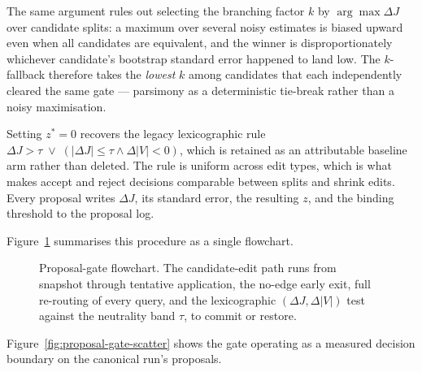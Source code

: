 The same argument rules out selecting the branching factor $k$ by
$\arg\max \Delta J$ over candidate splits: a maximum over several noisy
estimates is biased upward even when all candidates are equivalent, and
the winner is disproportionately whichever candidate's bootstrap
standard error happened to land low. The $k$-fallback therefore takes
the \emph{lowest} $k$ among candidates that each independently cleared
the same gate --- parsimony as a deterministic tie-break rather than a
noisy maximisation.

Setting $z^{*} = 0$ recovers the legacy lexicographic rule
$\Delta J > \tau \;\vee\; (|\Delta J| \leq \tau \wedge \Delta|V| < 0)$,
which is retained as an attributable baseline arm rather than deleted.
The rule is uniform across edit types, which is what makes accept and
reject decisions comparable between splits and shrink edits.
Every proposal writes $\Delta J$, its standard error, the resulting
$z$, and the binding threshold to the proposal log.

Figure~\ref{fig:proposal-gate-flow} summarises this procedure as a
single flowchart.

\begin{figure}[htbp]
\centering
{}
\caption{Proposal-gate flowchart. The candidate-edit path runs from
snapshot through tentative application, the no-edge early exit,
full re-routing of every query, and the lexicographic
$(\Delta J, \Delta |V|)$ test against the neutrality band $\tau$, to
commit or restore.}
\label{fig:proposal-gate-flow}
\end{figure}

Figure~\ref{fig:proposal-gate-scatter} shows the gate operating as a
measured decision boundary on the canonical run's proposals.

